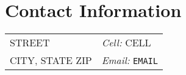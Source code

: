 \section{\sc Contact Information} %
\vspace{.05in}
\begin{tabular}{@{}p{2.8in}p{2.8in}}
STREET                                   & {\it Cell:}    CELL \\
CITY, STATE ZIP                          & {\it Email:}  \texttt{EMAIL}\\        
\end{tabular}
